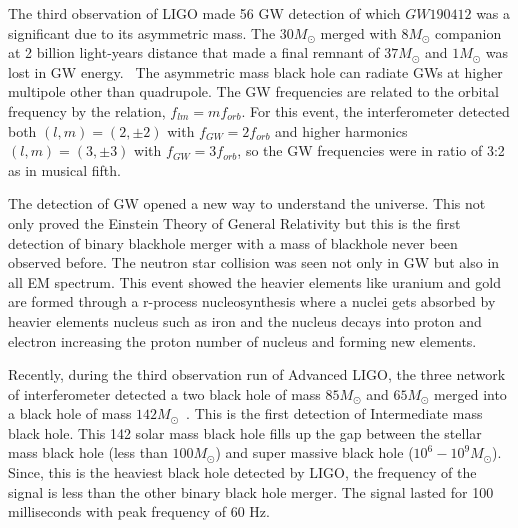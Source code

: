 \documentclass{ttuthes2007}
\begin{document}
The third observation of LIGO made 56 \ac{GW} detection of which $GW190412$ was
a significant due to its asymmetric mass. The $30M_\odot$ merged with
$8M_\odot$ companion at 2 billion light-years distance that made a final remnant 
 of  $37M_\odot$ and $1M_\odot$ was lost in \ac{GW}
energy.~\cite{collaboration2020gw190412} The asymmetric
mass black hole can radiate \acp{GW} at higher multipole other than quadrupole.
The \ac{GW} frequencies are related to the orbital frequency by the relation, 
$f_{lm}=mf_{orb}$. For this event, the interferometer detected both
$(l,m)=(2,\pm 2)$ with $f_{GW}=2f_{orb}$ and higher harmonics $(l,m)=(3,\pm 3)$ with
$f_{GW}=3f_{orb}$, so the \ac{GW} frequencies were in ratio of 3:2 as in musical
fifth.

The detection of \ac{GW} opened a new way to understand the universe. This not
only proved the Einstein Theory of General Relativity but this is the first
detection of binary blackhole merger with a  mass of blackhole never been
observed before. The neutron star collision was seen not only in \ac{GW} but also
in all \ac{EM} spectrum. This event showed the heavier elements like uranium and
gold are formed through a r-process nucleosynthesis where a nuclei gets absorbed
by heavier elements nucleus such as iron and the nucleus decays into proton and
electron increasing the proton number of nucleus and forming new elements. 

Recently, during the third observation run of Advanced \ac{LIGO}, the
three network of interferometer detected a two black hole of mass $85M_\odot$ and $65M_\odot$
merged into a black hole of mass $142M_\odot$~\cite{Abbott_2020}. This is the first detection of
Intermediate mass black hole. This 142 solar mass black hole fills up the gap
between the stellar mass black hole (less than $100M_\odot$) and super massive
black hole ($10^6-10^9 M_\odot$). Since, this is the heaviest black hole
detected by \ac{LIGO}, the frequency of the signal is less than the other
binary black hole merger. The signal lasted for 100 milliseconds with peak
frequency of 60 Hz.

\end{document}
